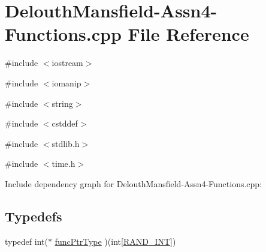 \hypertarget{_delouth_mansfield-_assn4-_functions_8cpp}{
\section{DelouthMansfield-\/Assn4-\/Functions.cpp File Reference}
\label{_delouth_mansfield-_assn4-_functions_8cpp}
}
{\ttfamily \#include $<$iostream$>$}\par
{\ttfamily \#include $<$iomanip$>$}\par
{\ttfamily \#include $<$string$>$}\par
{\ttfamily \#include $<$cstddef$>$}\par
{\ttfamily \#include $<$stdlib.h$>$}\par
{\ttfamily \#include $<$time.h$>$}\par
Include dependency graph for DelouthMansfield-\/Assn4-\/Functions.cpp:\subsection*{Typedefs}
\begin{DoxyCompactItemize}
\item 
typedef int($\ast$ \hyperlink{_delouth_mansfield-_assn4-_functions_8cpp_ae2987d0004dea58df8c833858c0fb370}{funcPtrType} )(int\mbox{[}\hyperlink{_delouth_mansfield-_assn4-_functions_8cpp_a134c2ba56ae9ba89c77a5c0dba9f2124}{RAND\_\-INT}\mbox{]})
\end{DoxyCompactItemize}
